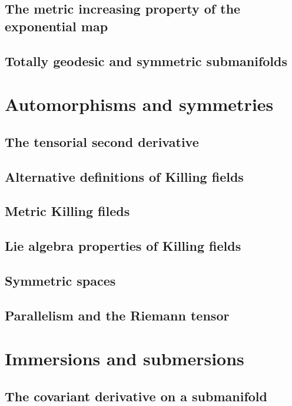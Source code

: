 \documentclass[a4paper]{article}
\begin{document}
\subsection{The metric increasing property of the exponential map}

\subsection{Totally geodesic and symmetric submanifolds}

\section{Automorphisms and symmetries}

\subsection{The tensorial second derivative}

\subsection{Alternative definitions of Killing fields}

\subsection{Metric Killing fileds}

\subsection{Lie algebra properties of Killing fields}

\subsection{Symmetric spaces}

\subsection{Parallelism and the Riemann tensor}

\section{Immersions and submersions}

\subsection{The covariant derivative on a submanifold}
\end{document}
